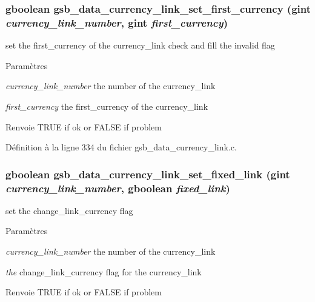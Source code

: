 \subsubsection[{gsb\_\-data\_\-currency\_\-link\_\-set\_\-first\_\-currency}]{\setlength{\rightskip}{0pt plus 5cm}gboolean gsb\_\-data\_\-currency\_\-link\_\-set\_\-first\_\-currency (gint {\em currency\_\-link\_\-number}, \/  gint {\em first\_\-currency})}\label{gsb__data__currency__link_8h_a299015b16318ea3ffb9962b8e57f43d9}
set the first\_\-currency of the currency\_\-link check and fill the invalid flag


\begin{DoxyParams}{Paramètres}
\item[{\em currency\_\-link\_\-number}]the number of the currency\_\-link \item[{\em first\_\-currency}]the first\_\-currency of the currency\_\-link\end{DoxyParams}
\begin{DoxyReturn}{Renvoie}
TRUE if ok or FALSE if problem 
\end{DoxyReturn}


Définition à la ligne 334 du fichier gsb\_\-data\_\-currency\_\-link.c.

\subsubsection[{gsb\_\-data\_\-currency\_\-link\_\-set\_\-fixed\_\-link}]{\setlength{\rightskip}{0pt plus 5cm}gboolean gsb\_\-data\_\-currency\_\-link\_\-set\_\-fixed\_\-link (gint {\em currency\_\-link\_\-number}, \/  gboolean {\em fixed\_\-link})}\label{gsb__data__currency__link_8h_a82b5b120da2c6a35a220b2aec872dd89}
set the change\_\-link\_\-currency flag


\begin{DoxyParams}{Paramètres}
\item[{\em currency\_\-link\_\-number}]the number of the currency\_\-link \item[{\em the}]change\_\-link\_\-currency flag for the currency\_\-link\end{DoxyParams}
\begin{DoxyReturn}{Renvoie}
TRUE if ok or FALSE if problem 
\end{DoxyReturn}


